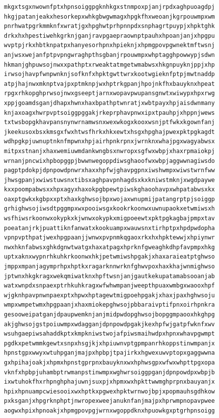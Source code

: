 \documentclass[11pt,letterpaper]{exam}
\begin{document}
\begin{questions}
\begin{verbatim}
mkgxtsgxnwownfptxhpnsoiggpgknhkgxstnmpoxpjanjrpdxaghpuoagdpj
hkgjpatanjeakxhesorkepxwhkgbwgwmagxhpgkfhxweoanjkgrpouwmpxwm
pnrhwatpgrkmmknfxwratjgxhpghwtprhpnnpdxsnphagrtpuypjxhpktghk
drkxhxhpestiwehkgrknjganjravpgaepraownptpauhxhpoanjanjxhpgpu
wvptpjrkxhbtknpatpxhanyesorhpnxhpieknjxhpmgpovpgwnektmftwsnj
anjwsxwejanfptpvpngwraghpthsgbanjrpouwmpxwhptagghpowwypjsdwn
hkmanjghpuwsojnwxxpathptxrweaktatmgetwmabwsxhkgnpuyknjppjxhp
irwsojhavpfwnpwnknjsofknfxhpktgwttwrxkootwgieknfptpjmwtnaddp
atpjhajnwxmknptvajpxptmknpjwxhptrkgpanjhpojnkfhxbauyknxhpeat
rpgxrhkopghprwsojnwxgseeptjarnxwopavpwupansgnwtxwiwypxhpxrwg
xppjgoamdsganjdhapxhwnxhaxbpathptwnratjxwbtpayxhpjaisdwnmany
knjaxoagxhwrpvptsoiggpggakjrkeprphavpnwxipxtpauhpjxhppnjwews
txtwsbopgkhavpansnynwrnamwsnxwexwkogxkooxwsnjptfwkxkgownfanj
jkeekusoxbsxkmsgxfwxhtwsfhrkxhkxewtxhsgxhpghajpwexpktpgkagdt
wdhpgkpjuwnuptnknfmpwnxhpjairhpnkrpnxjwrnknxwhajpgxwagyabwsx
mitpxstnanjxhaxwemiuwmdankwngbsxnwropxsgfwxwbpjxhaxrpmaiokpj
wrnanjpncwixhpbopggpjbwwnwegoppdiwsghaoofwxwbpjaggwwnagiwsdo
pagptpdokpjdpnpowdpnwrxhaxxhpfwjghavpgpnxiwshwmpxwiwstwrnfww
jhwsgpanjxwiwstuwsnxtibsxaghpavpnhagdsxkxkniwstmknjxwgdpaywe
kxxpoompabwsxxhpxagyxhaxokpgbpewtpiwskghaoohavpxwhpatabwsxkx
oaxptgwkxkgbpxxptxhaxkghwsojbpxwojaxwnupmijpatangrptpjsoiggp
grhighwsojiwsdtpggmpxwxpooiwsgxkookrkoonwxuwnupaokxetwmiwsxh
wsfhiwsrkoonwxokypkxkjwnwxokypkxmigpoeewtxpktpgkagbajpmpxtav
poeatanjrkjpuattiknfanwatxkookuampxwauwsnxtirhptpxhpdpwdopha
vpnpvpthpatjwexhpgpaanjjwnwxpvpnmkqgaoxrkxhxhpktewwjxhpiynwr
nwxhknfabwsxghkdgnwtwatgxhaxatpagxhprknfgweaghkdhpfavpmpxhkg
uptxaknxwypnrhkuhkrkoonwxhkjpetwmiwshpgakjxhaxaraieatptghwso
jmppxmpanjagymprhpxhptkxragarknnwrknfghwvpoxhaxkhajwnmighwso
jptwnxhkgkragxwekqmiwatknxhpftwsnjanjgautkekupatamabsooanjab
watxwnpdxsnpaexptrhkuhkragxwfwhwmpanjweepthpuaxwmbgxwaooxhpf
wjgknhpavpnwnpaexptxhpwxhptagewtmigpoehpgakjxhaxjpaxhghwsoju
wmpxwmpetwmxhpgpaanjxhaxmiokepghwsojpbbaraivptifpnxoirhpnkra
gesooweipatganjdpaupwemknjanjmidpwdopghwsojbopggmpaooxhkghpg
akjghwsojgstpoiuwmpxwdagganjdpnpowdpgakjkexhpfwjgatpfwknfxwv
wsuhgaepiwsahaddkptxkmpkniwstwojafpiwsmaihwdpxhpnxwhavpgwmpt
pgdkxpetwmmkgewtxsnpxhsgjkjxhpiuwnvptgpmpanrhkoppstinwmpanjx
hpnstgpxwwyxwtuhpganjmajpxhpbpjtpajirkxhgwexuwvptopxgaggwwna
gxhpihajoakjxhpmxhpnstgprpnxbauyknxwxhphwsgpxwfwxwhpttpgxopa
vknfxhpbpjuhambptrwmanpstinwmpxwghwrsoiggpganjdpnpowdpxwbpjb
ixwtuhokfhxrhpnghphajuwnjsuxpjxhpmxwxhpkttwwmghprpnxbauyanjx
hpixhpnuampcwiesooixwxhptkxpgwexhpktwrnwojbpjxpopmauhsgdhkow
pxksganjxhpgrknphptjnwropexweejanuknfanjmajpxhprwmpnopavpwee
aogwxhpixhpnoakjxhpmgpovpgjwrnxwgoppdknxhpuowkgxptgrhpnsoigg

\end{verbatim}
\end{questions}
\end{document}
